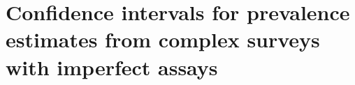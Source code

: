 \chapter{Confidence intervals for prevalence estimates from complex surveys with imperfect assays}
\label{ch:content_1}